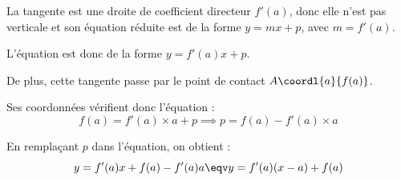 \begin{demo}
	La tangente est une droite de coefficient directeur $f'(a)$, donc elle n'est pas verticale et son équation réduite est de la forme $y = mx + p$, avec $m = f'(a)$.

	L'équation est donc de la forme $y = f'(a)x + p$.

	De plus, cette tangente passe par le point de contact $A\coordl{a}{f(a)}$.

	Ses coordonnées vérifient donc l'équation :
	\[
		f(a) = f'(a) \times a + p \implies p = f(a) - f'(a) \times a
	\]

	En remplaçant $p$ dans l'équation, on obtient :
	\[
		y = f'(a)x + f(a) - f'(a)a \eqv y = f'(a)(x - a) + f(a)
	\]

\end{demo}

